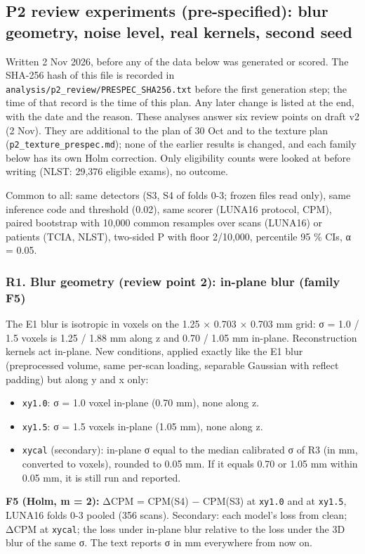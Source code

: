 \subsection*{P2 review experiments (pre-specified): blur geometry, noise level, real kernels, second seed}
Written 2 Nov 2026, before any of the data below was generated or scored. The SHA-256 hash of this file is recorded in \texttt{analysis/p2\_review/PRESPEC\_SHA256.txt} before the first generation step; the time of that record is the time of this plan. Any later change is listed at the end, with the date and the reason. These analyses answer six review points on draft v2 (2 Nov). They are additional to the plan of 30 Oct and to the texture plan (\texttt{p2\_texture\_prespec.md}); none of the earlier results is changed, and each family below has its own Holm correction. Only eligibility counts were looked at before writing (NLST: 29,376 eligible exams), no outcome.

Common to all: same detectors (S3, S4 of folds 0-3; frozen files read only), same inference code and threshold (0.02), same scorer (LUNA16 protocol, CPM), paired bootstrap with 10,000 common resamples over scans (LUNA16) or patients (TCIA, NLST), two-sided P with floor 2/10,000, percentile 95 \% CIs, α = 0.05.

\subsubsection*{R1. Blur geometry (review point 2): in-plane blur (family F5)}
The E1 blur is isotropic in voxels on the 1.25 × 0.703 × 0.703 mm grid: σ = 1.0 / 1.5 voxels is 1.25 / 1.88 mm along z and 0.70 / 1.05 mm in-plane. Reconstruction kernels act in-plane. New conditions, applied exactly like the E1 blur (preprocessed volume, same per-scan loading, separable Gaussian with reflect padding) but along y and x only:

\begin{itemize}
\item \texttt{xy1.0}: σ = 1.0 voxel in-plane (0.70 mm), none along z.
\item \texttt{xy1.5}: σ = 1.5 voxels in-plane (1.05 mm), none along z.
\item \texttt{xycal} (secondary): in-plane σ equal to the median calibrated σ of R3 (in mm, converted to voxels), rounded to 0.05 mm. If it equals 0.70 or 1.05 mm within 0.05 mm, it is still run and reported.
\end{itemize}

\textbf{F5 (Holm, m = 2):} ΔCPM = CPM(S4) − CPM(S3) at \texttt{xy1.0} and at \texttt{xy1.5}, LUNA16 folds 0-3 pooled (356 scans). Secondary: each model's loss from clean; ΔCPM at \texttt{xycal}; the loss under in-plane blur relative to the loss under the 3D blur of the same σ. The text reports σ in mm everywhere from now on.


